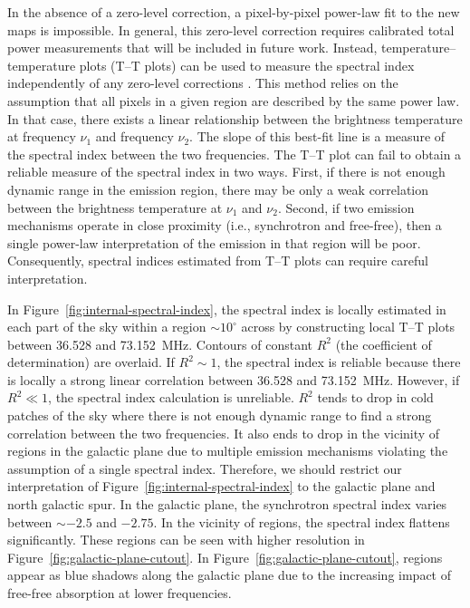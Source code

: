 \begin{bibunit}
In the absence of a zero-level correction, a pixel-by-pixel power-law fit to the new maps is
impossible. In general, this zero-level correction requires calibrated total power measurements that
will be included in future work.  Instead, temperature--temperature plots (T--T plots) can be used
to measure the spectral index independently of any zero-level corrections
\citep{1962MNRAS.124..297T}.  This method relies on the assumption that all pixels in a given region
are described by the same power law. In that case, there exists a linear relationship between the
brightness temperature at frequency $\nu_1$ and frequency $\nu_2$. The slope of this best-fit line
is a measure of the spectral index between the two frequencies. The T--T plot can fail to obtain a
reliable measure of the spectral index in two ways.  First, if there is not enough dynamic range in
the emission region, there may be only a weak correlation between the brightness temperature at
$\nu_1$ and $\nu_2$.  Second, if two emission mechanisms operate in close proximity (i.e.,
synchrotron and free-free), then a single power-law interpretation of the emission in that region
will be poor. Consequently, spectral indices estimated from T--T plots can require careful
interpretation.

In Figure~\ref{fig:internal-spectral-index}, the spectral index is locally estimated in each part of
the sky within a region $\sim10^\circ$ across by constructing local T--T plots between 36.528 and
73.152~MHz. Contours of constant $R^2$ (the coefficient of determination) are overlaid. If $R^2\sim
1$, the spectral index is reliable because there is locally a strong linear correlation between
36.528 and 73.152~MHz. However, if $R^2\ll 1$, the spectral index calculation is unreliable.  $R^2$
tends to drop in cold patches of the sky where there is not enough dynamic range to find a strong
correlation between the two frequencies. It also  ends to drop in the vicinity of  regions
in the galactic plane due to multiple emission mechanisms violating the assumption of a single
spectral index. Therefore, we should restrict our interpretation of
Figure~\ref{fig:internal-spectral-index} to the galactic plane and north galactic spur. In the
galactic plane, the synchrotron spectral index varies between $\sim-2.5$ and $-2.75$. In the
vicinity of  regions, the spectral index flattens significantly.  These  regions
can be seen with higher resolution in Figure~\ref{fig:galactic-plane-cutout}. In
Figure~\ref{fig:galactic-plane-cutout},  regions appear as blue shadows along the galactic
plane due to the increasing impact of free-free absorption at lower frequencies.


\end{bibunit}
